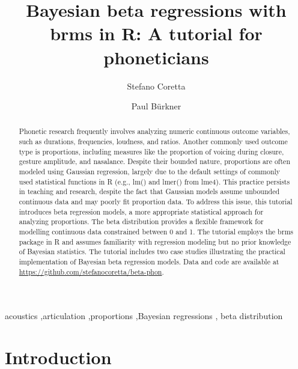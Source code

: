 \documentclass[
  authoryear,
  preprint,
  3p]{elsarticle}
\begin{document}
\begin{frontmatter}
\title{Bayesian beta regressions with brms in R: A tutorial for
phoneticians}
\author[1]{Stefano Coretta%
%
}
\author[2]{Paul Bürkner%
%
}




        
\begin{abstract}
Phonetic research frequently involves analyzing numeric continuous
outcome variables, such as durations, frequencies, loudness, and ratios.
Another commonly used outcome type is proportions, including measures
like the proportion of voicing during closure, gesture amplitude, and
nasalance. Despite their bounded nature, proportions are often modeled
using Gaussian regression, largely due to the default settings of
commonly used statistical functions in R (e.g., lm() and lmer() from
lme4). This practice persists in teaching and research, despite the fact
that Gaussian models assume unbounded continuous data and may poorly fit
proportion data. To address this issue, this tutorial introduces beta
regression models, a more appropriate statistical approach for analyzing
proportions. The beta distribution provides a flexible framework for
modelling continuous data constrained between 0 and 1. The tutorial
employs the brms package in R and assumes familiarity with regression
modeling but no prior knowledge of Bayesian statistics. The tutorial
includes two case studies illustrating the practical implementation of
Bayesian beta regression models. Data and code are available at
\url{https://github.com/stefanocoretta/beta-phon}.
\end{abstract}





\begin{keyword}
    acoustics \sep articulation \sep proportions \sep Bayesian
regressions \sep 
    beta distribution
\end{keyword}
\end{frontmatter}
    

\section{Introduction}\label{introduction}
\end{document}
